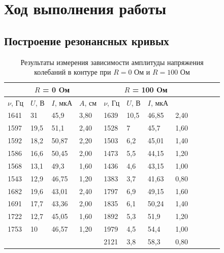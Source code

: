 \documentclass[10pt,a4paper]{article}
\begin{document}
	\section{Ход выполнения работы}
	\subsection{Построение резонансных кривых}
	
	\begin{table}[h!]
\centering
\begin{tabular}{|l|l|l|l|l|l|l|l|l|l|l|l|}
    \hline
        \multicolumn{4}{|c|}{$R$ = 0 Oм} & \multicolumn{4}{|c|}{$R$ = 100 Oм} \\ \hline
        {$\nu$, Гц} & {$U$, В} & {$I$, мкА} & {$A$, см} & {$\nu$, Гц} & {$U$, В} & {$I$, мкА} & {$A$, см \\ \hline
       1641 & 31 & 45,9 & 3,80 & 1639 & 10,5 & 46,85 & 2,40 \\ \hline
        1597 & 19,5 & 51,1 & 2,40 & 1528 & 7 & 45,7 & 1,60 \\ \hline
        1592 & 18,2 & 50,87 & 2,20 & 1503 & 6,2 & 45,01 & 1,40 \\ \hline
        1586 & 16,6 & 50,45 & 2,00 & 1473 & 5,5 & 44,15 & 1,20 \\ \hline
        1568 & 13,1 & 49,3 & 1,60 & 1436 & 4,6 & 43,15 & 1,00 \\ \hline
        1543 & 12,9 & 46,75 & 1,20 & 1383 & 3,7 & 41,63 & 0,80 \\ \hline
        1682 & 19,6 & 43,01 & 2,40 & 1797 & 6,9 & 49,15 & 1,60 \\ \hline
        1691 & 17,7 & 43,36 & 2,00 & 1835 & 6,1 & 50,24 & 1,40 \\ \hline
        1722 & 12,7 & 45,05 & 1,60 & 1892 & 5,3 & 51,9 & 1,20 \\ \hline
        1753 & 10 & 46,57 & 1,20 & 1979 & 4,5 & 54,4 & 1,00 \\ \hline
        ~ & ~ & ~ & ~ & 2121 & 3,8 & 58,3 & 0,80 \\ \hline
    \end{tabular}
\caption{Результаты измерения зависимости амплитуды напряжения колебаний в контуре при $R = 0$ Ом и $R = 100$ Ом}
\label{tab:amplitude_measuring}
\end{table}
\end{document}

